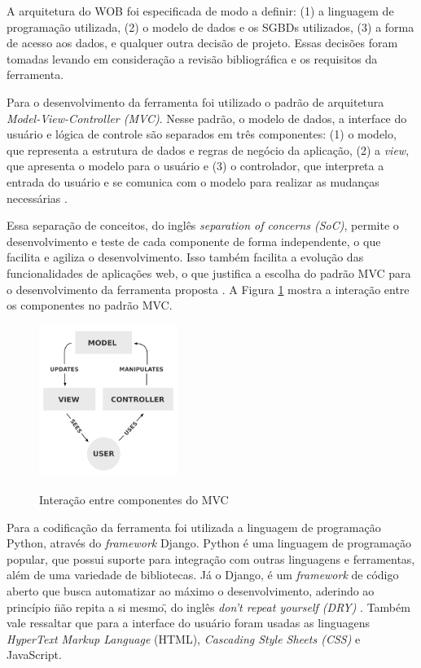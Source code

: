 A arquitetura do WOB foi especificada de modo a definir: (1) a linguagem de 
programação utilizada, (2) o modelo de dados e os SGBDs utilizados, (3) a forma de acesso 
aos dados, e qualquer outra decisão de projeto. Essas decisões foram tomadas levando em 
consideração a revisão bibliográfica e os requisitos da ferramenta.

Para o desenvolvimento da ferramenta foi utilizado o padrão de arquitetura 
\textit{Model-View-Controller (MVC)}. Nesse padrão, o modelo de dados, a interface do 
usuário e lógica de controle são separados em três componentes: (1) o modelo, que 
representa a estrutura de dados e regras de negócio da aplicação, (2) a \textit{view}, 
que apresenta o modelo para o usuário e (3) o controlador, que interpreta a entrada do 
usuário e se comunica com o modelo para realizar as mudanças necessárias \cite{plekhanova2009evaluating}. 

Essa separação de conceitos, do inglês \textit{separation of concerns (SoC)}, permite o 
desenvolvimento e teste de cada componente de forma independente, o que facilita e agiliza o 
desenvolvimento. Isso também facilita a evolução das funcionalidades de aplicações web, o que 
justifica a escolha do padrão MVC para o desenvolvimento da ferramenta proposta 
\cite{gupta2012}. A Figura \ref{fig:mvc} mostra a interação entre os componentes no 
padrão MVC.

\begin{figure}[!htb]
    \centering
    \caption{Interação entre componentes do MVC}
    \includegraphics[width=0.4\textwidth]{./04-figuras/mvc}
    \label{fig:mvc}
\end{figure}

Para a codificação da ferramenta foi utilizada a linguagem de programação Python, através do 
\textit{framework} Django. Python é uma linguagem de programação popular, que possui suporte 
para integração com outras linguagens e ferramentas, além de uma variedade de bibliotecas. 
Já o Django, é um \textit{framework} de código aberto que busca automatizar ao máximo o 
desenvolvimento, aderindo ao princípio \"não repita a si mesmo\", do inglês 
\textit{don’t repeat yourself (DRY)} \cite{plekhanova2009evaluating}. Também vale ressaltar 
que para a interface do usuário foram usadas as linguagens 
\textit{HyperText Markup Language} (HTML), \textit{Cascading Style Sheets (CSS)} e JavaScript.

